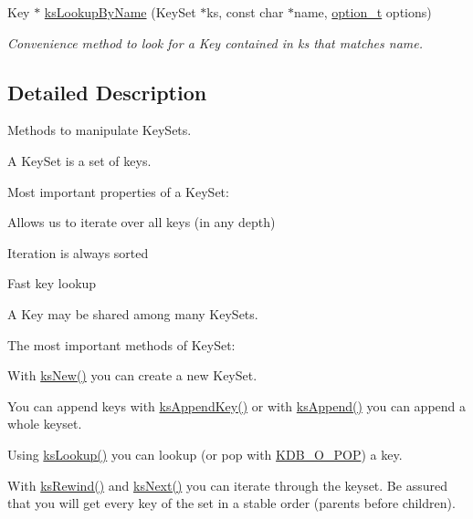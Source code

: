 \begin{DoxyCompactItemize}
Key $\ast$ \hyperlink{group__keyset_gad2e30fb6d4739d917c5abb2ac2f9c1a1}{ks\+Lookup\+By\+Name} (Key\+Set $\ast$ks, const char $\ast$name, \hyperlink{group__keyset_ga98a3d6a4016c9dad9cbd1a99a9c2a45a}{option\+\_\+t} options)
\begin{DoxyCompactList}\small\item\em Convenience method to look for a Key contained in {\ttfamily ks} that matches {\ttfamily name}. \end{DoxyCompactList}\end{DoxyCompactItemize}


\subsection{Detailed Description}
Methods to manipulate Key\+Sets. 

A Key\+Set is a set of keys.

Most important properties of a Key\+Set\+:


\begin{DoxyItemize}
\item Allows us to iterate over all keys (in any depth)
\item Iteration is always sorted
\item Fast key lookup
\item A Key may be shared among many Key\+Sets.
\end{DoxyItemize}

The most important methods of Key\+Set\+:


\begin{DoxyItemize}
\item With \hyperlink{group__keyset_ga671e1aaee3ae9dc13b4834a4ddbd2c3c}{ks\+New()} you can create a new Key\+Set.
\item You can append keys with \hyperlink{group__keyset_gaa5a1d467a4d71041edce68ea7748ce45}{ks\+Append\+Key()} or with \hyperlink{group__keyset_ga21eb9c3a14a604ee3a8bdc779232e7b7}{ks\+Append()} you can append a whole keyset.
\item Using \hyperlink{group__keyset_gaa34fc43a081e6b01e4120daa6c112004}{ks\+Lookup()} you can lookup (or pop with \hyperlink{group__keyset_gga98a3d6a4016c9dad9cbd1a99a9c2a45aa52fb5f2cc86773d393da62bebebf7984}{K\+D\+B\+\_\+\+O\+\_\+\+P\+OP}) a key.
\item With \hyperlink{group__keyset_gabe793ff51f1728e3429c84a8a9086b70}{ks\+Rewind()} and \hyperlink{group__keyset_ga317321c9065b5a4b3e33fe1c399bcec9}{ks\+Next()} you can iterate through the keyset. Be assured that you will get every key of the set in a stable order (parents before children).
\end{DoxyItemize}

